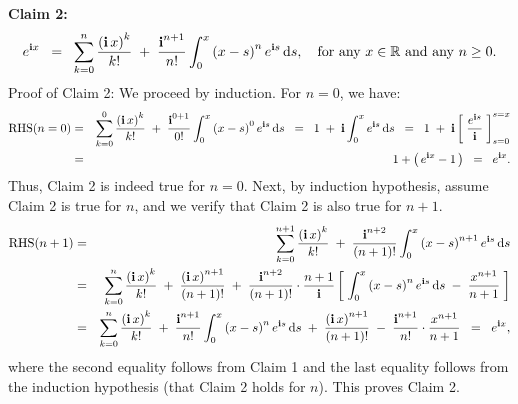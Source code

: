 \vskip 0.5cm
\noindent
\textbf{Claim 2:}
\begin{equation*}
e^{\textnormal{\bf i} x}
\;\;=\;\;
\sum_{k=0}^{n}\dfrac{\left(\textnormal{\bf i}\,x\right)^{k}}{k!}
\;+\; \dfrac{\textnormal{\bf i}^{n+1}}{n!}\int_{0}^{x}\left(x-s\right)^{n}e^{\textnormal{\bf i} s}\,\textnormal{d} s,
\quad
\textnormal{for any $x \in \mathbb{R}$ and any $n \geq 0$.}
\end{equation*}
{\small Proof of Claim 2: We proceed by induction.
For $n = 0$, we have:
\begin{eqnarray*}
\textnormal{RHS}(n=0)
&=&
\sum_{k=0}^{0}\dfrac{\left(\textnormal{\bf i}\,x\right)^{k}}{k!}
\;+\; \dfrac{\textnormal{\bf i}^{0+1}}{0!}\int_{0}^{x}\left(x-s\right)^{0}e^{\textnormal{\bf i} s}\,\textnormal{d} s
\;\;=\;\; 1 \;+\; \textnormal{\bf i}\int_{0}^{x} e^{\textnormal{\bf i} s}\,\textnormal{d} s
\;\;=\;\; 1 \;+\; \textnormal{\bf i}\left[\;\dfrac{e^{\textnormal{\bf i} s}}{\textnormal{\bf i}}\;\right]_{s=0}^{s=x}
\\
&=& 1 + \left(\,e^{\textnormal{\bf i} x} - 1\,\right) \;\;=\;\; e^{\textnormal{\bf i} x}.
\end{eqnarray*}
Thus, Claim 2 is indeed true for $n = 0$.
Next, by induction hypothesis, assume Claim 2 is true for $n$,
and we verify that Claim 2 is also true for $n+1$.
\begin{eqnarray*}
\textnormal{RHS}(n+1)
&=& \sum_{k=0}^{n+1}\dfrac{\left(\textnormal{\bf i}\,x\right)^{k}}{k!} \;+\; \dfrac{\textnormal{\bf i}^{n+2}}{(n+1)!}\int_{0}^{x}\left(x-s\right)^{n+1}e^{\textnormal{\bf i} s}\,\textnormal{d} s
\\
&=&
\sum_{k=0}^{n}\dfrac{\left(\textnormal{\bf i}\,x\right)^{k}}{k!}
\;+\; \dfrac{\left(\textnormal{\bf i}\,x\right)^{n+1}}{(n+1)!}
\;+\; \dfrac{\textnormal{\bf i}^{n+2}}{(n+1)!}\cdot\dfrac{n+1}{\textnormal{\bf i}}\left[\;\int_{0}^{x}\left(x-s\right)^{n}e^{\textnormal{\bf i} s}\,\textnormal{d} s \;-\; \dfrac{x^{n+1}}{n+1} \;\right]
\\
&=& 
\sum_{k=0}^{n}\dfrac{\left(\textnormal{\bf i}\,x\right)^{k}}{k!}
\;+\; \dfrac{\textnormal{\bf i}^{n+1}}{n!}\int_{0}^{x}\left(x-s\right)^{n}e^{\textnormal{\bf i} s}\,\textnormal{d} s
\;+\; \dfrac{\left(\textnormal{\bf i}\,x\right)^{n+1}}{(n+1)!}
\;-\; \dfrac{\textnormal{\bf i}^{n+1}}{n!}\cdot\dfrac{x^{n+1}}{n+1}
\;\;=\;\; e^{\textnormal{\bf i} x},
\end{eqnarray*}
where the second equality follows from Claim 1 and the last equality follows from the induction hypothesis (that Claim 2 holds for $n$).
This proves Claim 2.
}

